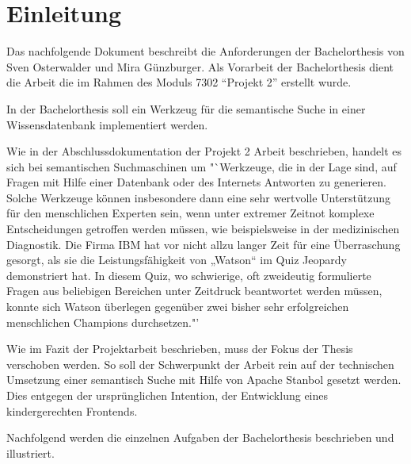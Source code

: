 \chapter{Einleitung}
\label{chap:einleitung}

Das nachfolgende Dokument beschreibt die Anforderungen der Bachelorthesis von Sven Osterwalder und Mira Günzburger. Als Vorarbeit der Bachelorthesis dient die Arbeit die im Rahmen des Moduls 7302 "`Projekt 2"' erstellt wurde.

In der Bachelorthesis soll ein Werkzeug für die semantische Suche in einer Wissensdatenbank implementiert werden.

Wie in der Abschlussdokumentation der Projekt 2 Arbeit beschrieben, handelt es sich bei semantischen  Suchmaschinen um "`Werkzeuge, die in der Lage sind, auf Fragen mit Hilfe einer Datenbank oder des Internets Antworten zu generieren. Solche Werkzeuge können insbesondere dann eine sehr wertvolle Unterstützung für den menschlichen Experten sein, wenn unter extremer Zeitnot komplexe Entscheidungen getroffen werden müssen, wie beispielsweise in der medizinischen Diagnostik. Die Firma IBM hat vor nicht allzu langer Zeit für eine Überraschung gesorgt, als sie die Leistungsfähigkeit von „Watson“ im Quiz Jeopardy demonstriert hat. In diesem Quiz, wo schwierige, oft zweideutig formulierte Fragen aus beliebigen Bereichen unter Zeitdruck beantwortet werden müssen, konnte sich Watson überlegen gegenüber zwei bisher sehr erfolgreichen menschlichen Champions durchsetzen."'\cite{projekt2Doc}

Wie im Fazit der Projektarbeit beschrieben, muss der Fokus der Thesis verschoben werden. So soll der Schwerpunkt der Arbeit rein auf der technischen Umsetzung einer semantisch Suche mit Hilfe von Apache Stanbol gesetzt werden. Dies entgegen der ursprünglichen Intention, der Entwicklung eines kindergerechten Frontends. 

Nachfolgend werden die einzelnen Aufgaben der Bachelorthesis beschrieben und illustriert. 

